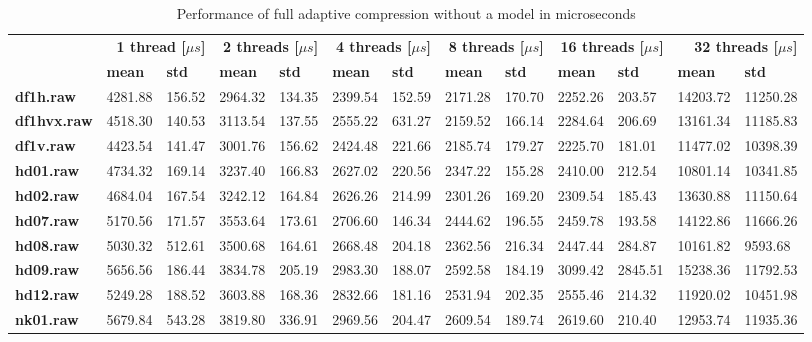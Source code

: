 \begin{table}[ht!]
\centering
\small
\begin{tabular}{l|ll|ll|ll|ll|ll|ll}
    & \multicolumn{2}{r|}{\textbf{1 thread [$\mu s$]}} & \multicolumn{2}{r|}{\textbf{2 threads [$\mu s$]}} & \multicolumn{2}{r|}{\textbf{4 threads [$\mu s$]}} & \multicolumn{2}{r|}{\textbf{8 threads [$\mu s$]}} & \multicolumn{2}{r|}{\textbf{16 threads [$\mu s$]}} & \multicolumn{2}{r}{\textbf{32 threads [$\mu s$]}} \\
    & \textbf{mean} & \textbf{std} & \textbf{mean} & \textbf{std} & \textbf{mean} & \textbf{std} & \textbf{mean} & \textbf{std} & \textbf{mean} & \textbf{std} & \textbf{mean} & \textbf{std} \\
\hline
    \textbf{df1h.raw} & 4281.88 & 156.52 & 2964.32 & 134.35 & 2399.54 & 152.59 & 2171.28 & 170.70 & 2252.26 & 203.57 & 14203.72 & 11250.28 \\
    \textbf{df1hvx.raw} & 4518.30 & 140.53 & 3113.54 & 137.55 & 2555.22 & 631.27 & 2159.52 & 166.14 & 2284.64 & 206.69 & 13161.34 & 11185.83 \\
    \textbf{df1v.raw} & 4423.54 & 141.47 & 3001.76 & 156.62 & 2424.48 & 221.66 & 2185.74 & 179.27 & 2225.70 & 181.01 & 11477.02 & 10398.39 \\
    \textbf{hd01.raw} & 4734.32 & 169.14 & 3237.40 & 166.83 & 2627.02 & 220.56 & 2347.22 & 155.28 & 2410.00 & 212.54 & 10801.14 & 10341.85 \\
    \textbf{hd02.raw} & 4684.04 & 167.54 & 3242.12 & 164.84 & 2626.26 & 214.99 & 2301.26 & 169.20 & 2309.54 & 185.43 & 13630.88 & 11150.64 \\
    \textbf{hd07.raw} & 5170.56 & 171.57 & 3553.64 & 173.61 & 2706.60 & 146.34 & 2444.62 & 196.55 & 2459.78 & 193.58 & 14122.86 & 11666.26 \\
    \textbf{hd08.raw} & 5030.32 & 512.61 & 3500.68 & 164.61 & 2668.48 & 204.18 & 2362.56 & 216.34 & 2447.44 & 284.87 & 10161.82 & 9593.68 \\
    \textbf{hd09.raw} & 5656.56 & 186.44 & 3834.78 & 205.19 & 2983.30 & 188.07 & 2592.58 & 184.19 & 3099.42 & 2845.51 & 15238.36 & 11792.53 \\
    \textbf{hd12.raw} & 5249.28 & 188.52 & 3603.88 & 168.36 & 2832.66 & 181.16 & 2531.94 & 202.35 & 2555.46 & 214.32 & 11920.02 & 10451.98 \\
    \textbf{nk01.raw} & 5679.84 & 543.28 & 3819.80 & 336.91 & 2969.56 & 204.47 & 2609.54 & 189.74 & 2619.60 & 210.40 & 12953.74 & 11935.36 \\
\end{tabular}
\caption{Performance of full adaptive compression without a model in microseconds}
\end{table}
